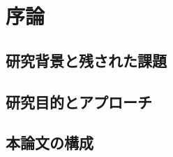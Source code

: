 

\chapter{序論}
\label{cha:1}

\section{研究背景と残された課題}
\label{sec:1.1}


\section{研究目的とアプローチ}
\label{sec:1.2}



\section{本論文の構成}
\label{sec:1.3}



